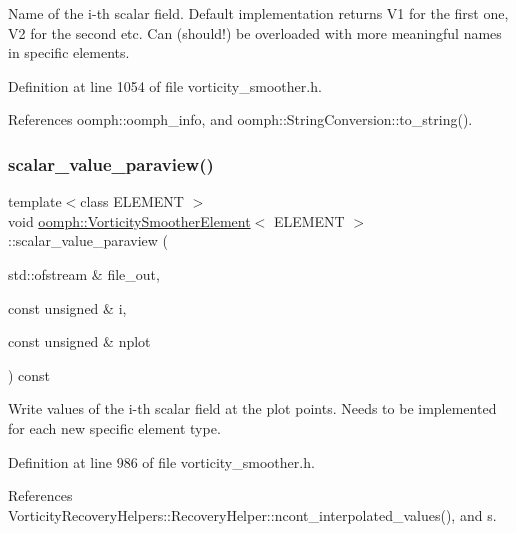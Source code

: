 Name of the i-\/th scalar field. Default implementation returns V1 for the first one, V2 for the second etc. Can (should!) be overloaded with more meaningful names in specific elements. 



Definition at line 1054 of file vorticity\+\_\+smoother.\+h.



References oomph\+::oomph\+\_\+info, and oomph\+::\+String\+Conversion\+::to\+\_\+string().

\mbox{\label{classoomph_1_1VorticitySmootherElement_a616f49cad0eaf25a0218730bda2f9b7f}} 
\subsubsection{\texorpdfstring{scalar\+\_\+value\+\_\+paraview()}{scalar\_value\_paraview()}}
{\footnotesize\ttfamily template$<$class E\+L\+E\+M\+E\+NT $>$ \\
void \hyperlink{classoomph_1_1VorticitySmootherElement}{oomph\+::\+Vorticity\+Smoother\+Element}$<$ E\+L\+E\+M\+E\+NT $>$\+::scalar\+\_\+value\+\_\+paraview (\begin{DoxyParamCaption}\item[{std\+::ofstream \&}]{file\+\_\+out,  }\item[{const unsigned \&}]{i,  }\item[{const unsigned \&}]{nplot }\end{DoxyParamCaption}) const\hspace{0.3cm}{\ttfamily [inline]}}



Write values of the i-\/th scalar field at the plot points. Needs to be implemented for each new specific element type. 



Definition at line 986 of file vorticity\+\_\+smoother.\+h.



References Vorticity\+Recovery\+Helpers\+::\+Recovery\+Helper\+::ncont\+\_\+interpolated\+\_\+values(), and s.

\mbox{\label{classoomph_1_1VorticitySmootherElement_a5297ce9dd4c4d23fa99daafc2764d7db}} 

